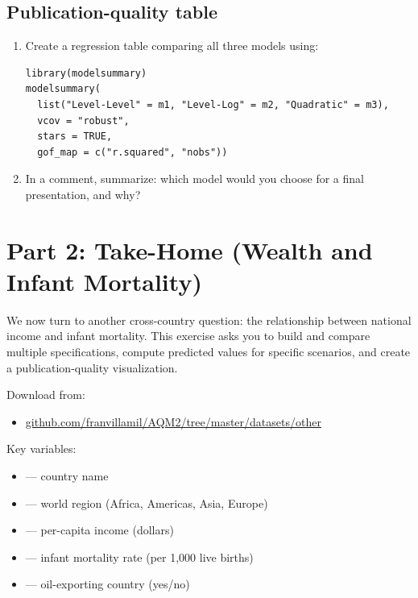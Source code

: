 \subsection{Publication-quality table}

\begin{enumerate}[label=\alph*)]
  \item Create a regression table comparing all three models using:
  \begin{lstlisting}
library(modelsummary)
modelsummary(
  list("Level-Level" = m1, "Level-Log" = m2, "Quadratic" = m3),
  vcov = "robust",
  stars = TRUE,
  gof_map = c("r.squared", "nobs"))
  \end{lstlisting}
  \item In a comment, summarize: which model would you choose for a final presentation, and why?
\end{enumerate}

\newpage

\section{Part 2: Take-Home (Wealth and Infant Mortality)}

We now turn to another cross-country question: the relationship between national income and infant mortality. This exercise asks you to build and compare multiple specifications, compute predicted values for specific scenarios, and create a publication-quality visualization.

Download  from:
\begin{itemize}
  \item \href{https://github.com/franvillamil/AQM2/tree/master/datasets/other}{github.com/franvillamil/AQM2/tree/master/datasets/other}
\end{itemize}

Key variables:
\begin{itemize}
  \item {} --- country name
  \item {} --- world region (Africa, Americas, Asia, Europe)
  \item {} --- per-capita income (dollars)
  \item {} --- infant mortality rate (per 1,000 live births)
  \item {} --- oil-exporting country (yes/no)
\end{itemize}


